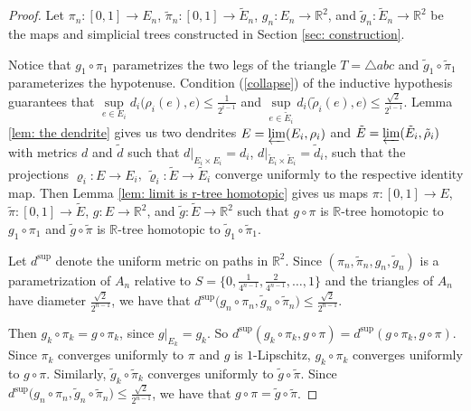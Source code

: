 \documentclass[11pt, leqno]{amsart}
\theoremstyle{definition}\newtheorem{definition}[theorem]{Definition}
\newcommand{\s}{\operatorname{sup}}
\begin{document}
\begin{proof}
Let $\pi_n: [0,1]\to E_n$, $\tilde\pi_n: [0,1]\to \tilde E_n$,  $g_n: E_n\to \mathbb{R}^2$, and $\tilde g_n: \tilde E_n\to \mathbb{R}^2$ be the maps and simplicial trees constructed in Section \ref{sec: construction}.

Notice that $g_1\circ\pi_1$ parametrizes the two legs of the triangle $T=\triangle abc$ and $\tilde g_1\circ\tilde \pi_1$ parameterizes the hypotenuse. Condition (\ref{collapse}) of the inductive hypothesis guarantees that $\sup\limits_{e\in E_i}d_i\big(\rho_i(e), e\big)\leq \frac{1}{2^{i-1}}$ and $\sup\limits_{e\in\tilde  E_i}d_i\big(\tilde \rho_i(e), e\big)\leq \frac{\sqrt 2}{2^{i-1}}$. Lemma \ref{lem: the dendrite} gives us two dendrites $E = \varprojlim(E_i, \rho_i)$ and $\tilde E = \varprojlim(\tilde E_i, \tilde \rho_i)$ with metrics $d$ and $\tilde d$ such that $d|_{E_i\times E_i}= d_i$, $d|_{\tilde  E_i\times\tilde  E_i}=\tilde  d_i$, such that the projections $\varrho_i: E\to E_i$, $\tilde \varrho_i: \tilde E\to \tilde E_i$ converge uniformly to the respective identity map. Then Lemma \ref{lem: limit is r-tree homotopic} gives us maps $\pi:[0,1]\to E$, $\tilde \pi:[0,1]\to \tilde E$, $g: E\to \mathbb{R}^2$, and  $\tilde g: \tilde E\to \mathbb{R}^2$ such that $g\circ\pi$ is $\mathbb R$-tree homotopic to $g_1\circ \pi_1$ and $\tilde g\circ\tilde \pi$ is $\mathbb R$-tree homotopic to $\tilde g_1\circ \tilde \pi_1$.

Let $d^{\s}$ denote the uniform metric on paths in $\mathbb{R}^2$. Since $(\pi_n, \tilde \pi_n, g_n, \tilde g_n) $ is a parametrization of $A_n$ relative to $S=\{0, \frac{1}{4^{n-1}}, \frac{2}{4^{n-1}}, \dots, 1\}$ and the triangles of $A_n$ have diameter $\frac{\sqrt{2}}{2^{n-1}}$, we have that $d^{\s}\big(g_n\circ\pi_n,\tilde g_n\circ\tilde \pi_n \big)\leq \frac{\sqrt2}{2^{n-1}}$.

Then $g_k\circ \pi_k = g\circ \pi_k$, since $g|_{E_k} = g_k$. So $d^{\s}(g_k\circ \pi_k, g\circ \pi) = d^{\s}(g\circ \pi_k, g\circ \pi)$.  Since $\pi_k$ converges uniformly to $\pi$ and $g$ is $1$-Lipschitz, $g_k\circ \pi_k$ converges uniformly to $g\circ \pi$.  Similarly, $\tilde g_k\circ \tilde \pi_k$ converges uniformly to $\tilde g\circ\tilde  \pi$. Since $d^{\s}\big(g_n\circ\pi_n,\tilde g_n\circ\tilde \pi_n \big)\leq \frac{\sqrt2}{2^{n-1}}$, we have that $g\circ \pi= \tilde g\circ\tilde  \pi$.


\end{proof}
\end{document}
